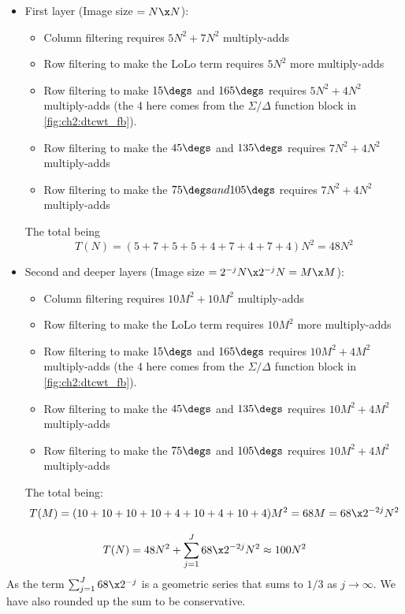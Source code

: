   \begin{itemize}
    \item First layer (Image size $=N\x N$):
      \begin{itemize}
        \item Column filtering requires $5N^2+7N^2$ multiply-adds
        \item Row filtering to make the LoLo term requires $5N^2$ more
          multiply-adds
        \item Row filtering to make $15\degs$ and $165\degs$ requires
          $5N^2+4N^2$
          multiply-adds (the 4 here comes from the $\Sigma/\Delta$ function
          block in \autoref{fig:ch2:dtcwt_fb}).
        \item Row filtering to make the $45\degs$ and $135\degs$ requires $7N^2
          +4N^2$ multiply-adds
        \item Row filtering to make the $75\degs and 105\degs$ requires
          $7N^2+4N^2$
          multiply-adds
      \end{itemize}
      The total being 
      $$T(N) = (5+7+5+5+4+7+4+7+4)N^2 = 48N^2$$
    \item Second and deeper layers (Image size $=2^{-j}N\x 2^{-j}N=M\x M$):
      \begin{itemize}
        \item Column filtering requires $10M^2+10M^2$ multiply-adds
        \item Row filtering to make the LoLo term requires $10M^2$ more
          multiply-adds
        \item Row filtering to make $15\degs$ and $165\degs$ requires
          $10M^2+4M^2$
          multiply-adds (the 4 here comes from the $\Sigma/\Delta$ function
          block in \autoref{fig:ch2:dtcwt_fb}).
        \item Row filtering to make the $45\degs$ and $135\degs$ requires
          $10M^2 +4M^2$ multiply-adds
        \item Row filtering to make the $75\degs$ and $105\degs$ requires
          $10M^2+4M^2$
          multiply-adds
      \end{itemize}
      The total being: 
      $$T(M) = (10+10+10+10+4+10+4+10+4)M^2 = 68M = 68\x 2^{-2j}N^2$$
  \end{itemize}
  \begin{equation}
    T(N) = 48N^2 + \sum_{j=1}^{J} 68 \x 2^{-2j}N^2 \approx 100N^2
  \end{equation}
  As the term $\sum_{j=1}^{J} 68 \x 2^{-j}$ is a geometric series that sums to
  $1/3$ as $j \rightarrow \infty$. We have also rounded up the sum to be conservative.

